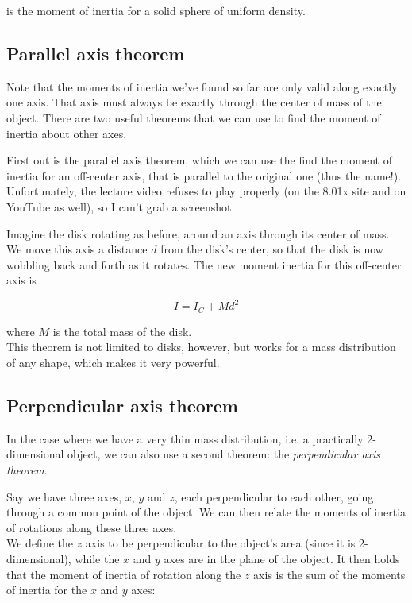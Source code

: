 \documentclass[12pt,a4paper]{report}
\begin{document}
is the moment of inertia for a solid sphere of uniform density.

\subsection{Parallel axis theorem}

Note that the moments of inertia we've found so far are only valid along exactly one axis. That axis must always be exactly through the center of mass of the object. There are two useful theorems that we can use to find the moment of inertia about other axes.

First out is the parallel axis theorem, which we can use the find the moment of inertia for an off-center axis, that is parallel to the original one (thus the name!).\\
Unfortunately, the lecture video refuses to play properly (on the 8.01x site and on YouTube as well), so I can't grab a screenshot.

Imagine the disk rotating as before, around an axis through its center of mass. We move this axis a distance $d$ from the disk's center, so that the disk is now wobbling back and forth as it rotates. The new moment inertia for this off-center axis is

\begin{equation}
I = I_C + M d^2
\end{equation}

where $M$ is the total mass of the disk.\\
This theorem is not limited to disks, however, but works for a mass distribution of any shape, which makes it very powerful.

\subsection{Perpendicular axis theorem}

In the case where we have a very thin mass distribution, i.e. a practically 2-dimensional object, we can also use a second theorem: the \emph{perpendicular axis theorem}.

Say we have three axes, $x$, $y$ and $z$, each perpendicular to each other, going through a common point of the object. We can then relate the moments of inertia of rotations along these three axes.\\
We define the $z$ axis to be perpendicular to the object's area (since it is 2-dimensional), while the $x$ and $y$ axes are in the plane of the object. It then holds that the moment of inertia of rotation along the $z$ axis is the sum of the moments of inertia for the $x$ and $y$ axes:
\end{document}
